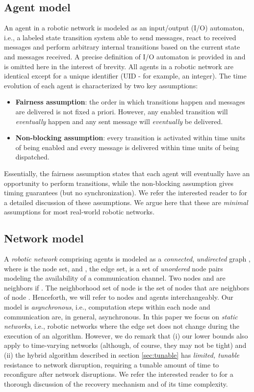 \documentclass[letterpaper,10pt,conference]{ieeeconf}
\begin{document}
\subsection{Agent model}
An agent in a robotic network is modeled as an input/output (I/O) automaton, i.e., a labeled state transition system able to send messages, react to received messages and perform arbitrary internal transitions based on the current state and  messages received. 
A precise definition of I/O automaton is provided in \cite[pp. 200-204]{NL:96} and is omitted here in the interest of brevity. All agents in a robotic network are identical except for a unique identifier (UID - for example, an integer).  The time evolution of each agent  is characterized by two key assumptions:
\begin{itemize}
\item {\bf Fairness assumption}: the order in which transitions happen and messages are delivered is not fixed a priori. However, any enabled transition will \emph{eventually} happen and any sent message will \emph{eventually} be delivered.
\item {\bf Non-blocking assumption}: every transition is activated within  time units of being enabled and every message is delivered within  time units of being dispatched.
\end{itemize}
Essentially, the fairness assumption states that each  agent will eventually have an opportunity to perform transitions, while the non-blocking assumption gives timing guarantees (but no synchronization). We refer the interested reader to \cite[pages 212-215]{NL:96} for a detailed discussion of these assumptions. We argue here that these are \emph{minimal} assumptions for most  real-world robotic networks. 


\subsection{Network model}
A \emph{robotic network} comprising  agents is modeled as a \emph{connected}, \emph{undirected} graph , where  is the node set, and , the edge set,  is a set of \emph{unordered} node pairs modeling the availability of a communication channel. Two nodes  and  are neighbors if .  The neighborhood set of node  is the set of nodes  that are neighbors of node . Henceforth, we will refer to nodes and agents interchangeably. Our model is \emph{asynchronous}, i.e., computation steps within each node and communication are, in general, asynchronous.
In this paper we focus on \emph{static networks}, i.e., robotic networks where the edge set does not change during the execution of an algorithm. 
However, we do remark that (i) our lower bounds also apply to time-varying networks (although, of course, they may not be tight) and (ii) the hybrid algorithm described in section \ref{sec:tunable} has \emph{limited, tunable} resistance to network disruption, requiring a tunable amount of time to reconfigure after network disruptions. We refer the interested reader to \cite{FR-MP:13} for a thorough discussion of the recovery mechanism and of its time complexity.
\end{document}

